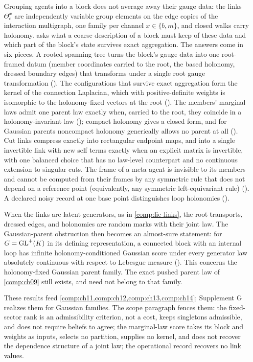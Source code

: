 Grouping agents into a block does not average away their gauge data: the links $\Theta^x_e$ are
independently variable group elements on the edge copies of the interaction multigraph, one family per channel
$x\in\{b,m\}$, and closed walks carry holonomy.  asks what a coarse description of
a block must keep of these data and which part of the block's state survives exact aggregation. The
answers come in six pieces. A rooted spanning tree turns the block's gauge data into one root-framed
datum (member coordinates carried to the root, the based holonomy, dressed boundary edges) that
transforms under a single root gauge transformation (). The configurations
that survive exact aggregation form the kernel of the connection Laplacian, which with positive-definite
weights is isomorphic to the holonomy-fixed vectors at the root (). The
members' marginal laws admit one parent law exactly when, carried to the root, they coincide in a
holonomy-invariant law (); compact holonomy gives a closed form, and for
Gaussian parents noncompact holonomy generically allows no parent at all
(). Cut links compress exactly into rectangular endpoint maps,
and into a single invertible link with new self terms exactly when an explicit matrix is invertible, with
one balanced choice that has no law-level counterpart and no continuous extension to singular cuts. The
frame of a meta-agent is invisible to its members and cannot be computed from their frames by any
symmetric rule that does not depend on a reference point (equivalently, any symmetric left-equivariant
rule) (). A declared noisy record at one base point distinguishes loop
holonomies ().

When the links are latent generators, as in \cref{comp:lie-links}, the root transports, dressed edges,
and holonomies are random marks with their joint law. The Gaussian-parent obstruction then becomes an
almost-sure statement: for $G=\mathrm{GL}^+(K)$ in its defining representation, a connected block with an
internal loop has infinite holonomy-conditioned Gaussian score under every generator law absolutely
continuous with respect to Lebesgue measure (). This concerns
the holonomy-fixed Gaussian parent family. The exact pushed parent law of \cref{comp:ch09} still
exists, and need not belong to that family.

These results feed \cref{comp:ch11,comp:ch12,comp:ch13,comp:ch14}; Supplement G realizes them for
Gaussian families. The scope paragraph fences them: the fixed-sector rank is an admissibility criterion,
not a cost, keeps singletons admissible, and does not require beliefs to agree; the marginal-law score
takes its block and weights as inputs, selects no partition, supplies no kernel, and does not recover
the dependence structure of a joint law; the operational record recovers no link values.

